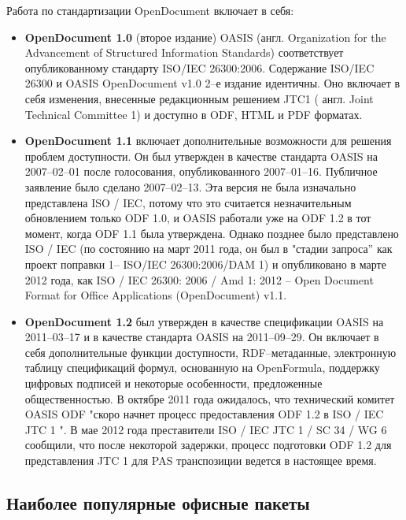 Работа по стандартизации OpenDocument включает в себя:
\begin{itemize}
  \item \textbf{OpenDocument 1.0} (второе издание) OASIS (англ. Organization for the Advancement of Structured Information Standards) соответствует опубликованному стандарту ISO/IEC 26300:2006. Содержание ISO/IEC 26300 и OASIS OpenDocument v1.0 2--е издание идентичны. Оно включает в себя изменения, внесенные редакционным решением JTC1 ( англ. Joint Technical Committee 1) и доступно в ODF, HTML и PDF форматах.
  \item \textbf{OpenDocument 1.1} включает дополнительные возможности для решения проблем доступности. Он был утвержден в качестве стандарта OASIS на 2007--02--01 после голосования, опубликованного 2007--01--16. Публичное заявление было сделано 2007--02--13. Эта версия не была изначально представлена ISO / IEC, потому что это считается незначительным обновлением только ODF 1.0, и OASIS работали уже на ODF 1.2 в тот момент, когда ODF 1.1 была утверждена. Однако позднее было представлено ISO / IEC (по состоянию на март 2011 года, он был в "стадии запроса'' как проект поправки 1-- ISO/IEC 26300:2006/DAM 1) и опубликовано в марте 2012 года, как ISO / IEC 26300: 2006 / Amd 1: 2012 -- Open Document Format for Office Applications (OpenDocument) v1.1.
  \item  \textbf{OpenDocument 1.2} был утвержден в качестве спецификации OASIS на 2011--03--17 и в качестве стандарта OASIS на 2011--09--29. Он включает в себя дополнительные функции доступности, RDF--метаданные, электронную таблицу спецификаций формул, основанную на OpenFormula, поддержку цифровых подписей и некоторые особенности, предложенные общественностью. В октябре 2011 года ожидалось, что технический комитет OASIS ODF "скоро начнет процесс предоставления ODF 1.2 в ISO / IEC JTC 1 ". В мае 2012 года преставители ISO / IEC JTC 1 / SC 34 / WG 6 сообщили, что после некоторой задержки, процесс подготовки ODF 1.2 для представления JTC 1 для PAS транспозиции ведется в настоящее время.
\end{itemize} 
\subsection{Наиболее популярные офисные пакеты}

